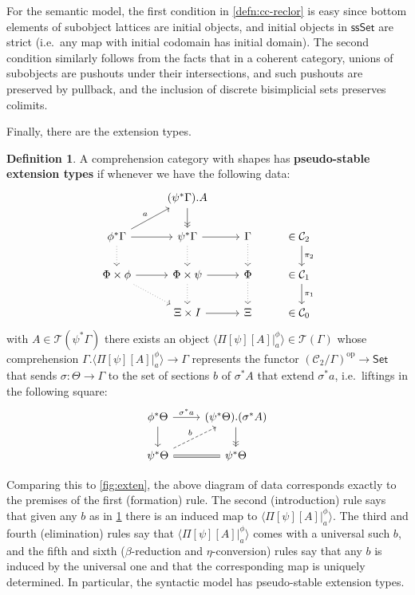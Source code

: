 \documentclass[12pt]{amsart}
\theoremstyle{plain}
\theoremstyle{definition}
\newtheorem{defn}[thm]{Definition}
\theoremstyle{remark}
\numberwithin{equation}{section}
\newcommand{\ccexten}[4]{\langle\Pi[#1][#2] |^{#3}_{#4}\rangle}
\newcommand{\Set}{\mathsf{Set}}
\newcommand{\ssSet}{\mathsf{ssSet}}
\newcommand{\op}{\mathrm{op}}
\newcommand{\C}{\mathcal{C}}
\newcommand{\T}{\mathcal{T}}
\begin{document}
For the semantic model, the first condition in \cref{defn:cc-reclor} is easy since bottom elements of subobject lattices are initial objects, and initial objects in $\ssSet$ are strict (i.e.\ any map with initial codomain has initial domain).
The second condition similarly follows from the facts that in a coherent category, unions of subobjects are pushouts under their intersections, and such pushouts are preserved by pullback, and the inclusion of discrete bisimplicial sets preserves colimits.

Finally, there are the extension types.


\begin{defn}\label{defn:cc-exten}
  A comprehension category with shapes has \textbf{pseudo-stable extension types} if whenever we have the following data:
  \begin{equation}\label{eq:ccexten}
  \begin{tikzcd}
    & (\psi^*\Gamma).A \ar[d,->>]\\
    \phi^*\Gamma \ar[r] \ar[d,dotted] \ar[ur,"a"] & \psi^*\Gamma \ar[r] \ar[d,dotted] & \Gamma \ar[d,dotted] & \in \C_2 \ar[d,"\pi_2",shift left]\\
    \Phi\times \phi \ar[r] \ar[dr,dotted] &\Phi \times \psi \ar[r] \ar[d,dotted] & \Phi \ar[d,dotted] & \in \C_1 \ar[d,"\pi_1",shift left]\\
    &\Xi\times I \ar[r] & \Xi & \in\C_0
  \end{tikzcd}
  \end{equation}
  with $A\in\T(\psi^*\Gamma)$ there exists an object $\ccexten{\psi}{A}{\phi}{a} \in \T(\Gamma)$ whose comprehension
  $\Gamma.\ccexten{\psi}{A}{\phi}{a} \to \Gamma$
represents the functor $(\C_2/\Gamma)^\op\to\Set$ that sends $\sigma:\Theta\to\Gamma$ to the set of sections $b$ of $\sigma^*A$ that extend $\sigma^*a$, i.e.\ liftings in the following square:
  \begin{equation}
  \begin{tikzcd}
    \phi^*\Theta \ar[r,"\sigma^*a"] \ar[d] & (\psi^*\Theta).(\sigma^*A) \ar[d,->>]\\
    \psi^*\Theta \ar[r,equals] \ar[ur,dashed,"b"] & \psi^*\Theta
  \end{tikzcd}\label{eq:ccexten-lift}
  \end{equation}
\end{defn}

Comparing this to \cref{fig:exten}, the above diagram of data corresponds exactly to the premises of the first (formation) rule.
The second (introduction) rule says that given any $b$ as in \cref{defn:cc-exten} there is an induced map to $\ccexten{\psi}{A}{\phi}{a}$.
The third and fourth (elimination) rules say that $\ccexten{\psi}{A}{\phi}{a}$ comes with a universal such $b$, and the fifth and sixth ($\beta$-reduction and $\eta$-conversion) rules say that any $b$ is induced by the universal one and that the corresponding map is uniquely determined.
In particular, the syntactic model has pseudo-stable extension types.
\end{document}
